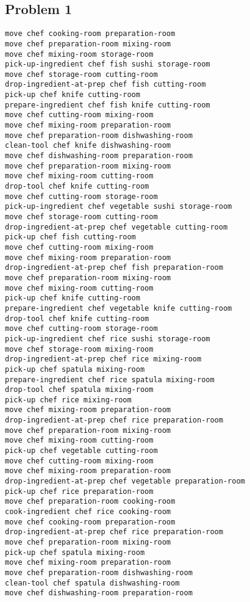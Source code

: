 \documentclass[a4paper,12pt]{article}
\begin{document}
\subsection{Problem 1}
\label{sec:plan1}
\begin{lstlisting}[language=PDDL, caption=Plan for Problem 1]
move chef cooking-room preparation-room 
move chef preparation-room mixing-room 
move chef mixing-room storage-room 
pick-up-ingredient chef fish sushi storage-room 
move chef storage-room cutting-room 
drop-ingredient-at-prep chef fish cutting-room 
pick-up chef knife cutting-room 
prepare-ingredient chef fish knife cutting-room 
move chef cutting-room mixing-room 
move chef mixing-room preparation-room 
move chef preparation-room dishwashing-room 
clean-tool chef knife dishwashing-room 
move chef dishwashing-room preparation-room 
move chef preparation-room mixing-room 
move chef mixing-room cutting-room 
drop-tool chef knife cutting-room 
move chef cutting-room storage-room 
pick-up-ingredient chef vegetable sushi storage-room 
move chef storage-room cutting-room 
drop-ingredient-at-prep chef vegetable cutting-room 
pick-up chef fish cutting-room 
move chef cutting-room mixing-room 
move chef mixing-room preparation-room 
drop-ingredient-at-prep chef fish preparation-room 
move chef preparation-room mixing-room 
move chef mixing-room cutting-room 
pick-up chef knife cutting-room 
prepare-ingredient chef vegetable knife cutting-room 
drop-tool chef knife cutting-room 
move chef cutting-room storage-room 
pick-up-ingredient chef rice sushi storage-room 
move chef storage-room mixing-room 
drop-ingredient-at-prep chef rice mixing-room 
pick-up chef spatula mixing-room 
prepare-ingredient chef rice spatula mixing-room 
drop-tool chef spatula mixing-room 
pick-up chef rice mixing-room 
move chef mixing-room preparation-room 
drop-ingredient-at-prep chef rice preparation-room 
move chef preparation-room mixing-room 
move chef mixing-room cutting-room 
pick-up chef vegetable cutting-room 
move chef cutting-room mixing-room 
move chef mixing-room preparation-room 
drop-ingredient-at-prep chef vegetable preparation-room 
pick-up chef rice preparation-room 
move chef preparation-room cooking-room 
cook-ingredient chef rice cooking-room 
move chef cooking-room preparation-room 
drop-ingredient-at-prep chef rice preparation-room 
move chef preparation-room mixing-room 
pick-up chef spatula mixing-room 
move chef mixing-room preparation-room 
move chef preparation-room dishwashing-room 
clean-tool chef spatula dishwashing-room 
move chef dishwashing-room preparation-room 

\end{lstlisting}
\end{document}
